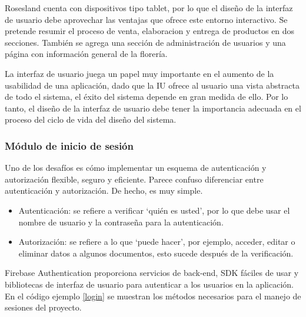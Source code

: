 Rosesland cuenta con dispositivos tipo tablet, por lo que el diseño de la interfaz de usuario debe aprovechar las ventajas que ofrece este entorno interactivo. Se pretende resumir el proceso de venta, elaboracion y entrega de productos en dos secciones. También se agrega una sección de administración de usuarios y una página con información general de la florería.
\vspace{0.8cm}

La interfaz de usuario juega un papel muy importante en el aumento de la usabilidad de una aplicación, dado que la IU ofrece al usuario una vista abstracta de todo el sistema, el éxito del sistema depende en gran medida de ello. Por lo tanto, el diseño de la interfaz de usuario debe tener la importancia adecuada en el proceso del ciclo de vida del diseño del sistema.
\vspace{0.8cm}

\subsubsection{Módulo de inicio de sesión}
Uno de los desafíos es cómo implementar un esquema de autenticación y autorización flexible, seguro y eficiente. Parece confuso diferenciar entre autenticación y autorización. De hecho, es muy simple.

\begin{itemize}
  \item Autenticación: se refiere a verificar `quién es usted', por lo que debe usar el nombre de usuario y la contraseña para la autenticación.

  \item Autorización: se refiere a lo que `puede hacer', por ejemplo, acceder, editar o eliminar datos a algunos documentos, esto sucede después de la verificación.
\end{itemize}

Firebase Authentication proporciona servicios de back-end, SDK fáciles de usar y bibliotecas de interfaz de usuario para autenticar a los usuarios en la aplicación. En el código ejemplo \ref{login} se muestran los métodos necesarios para el manejo de sesiones del proyecto.
\vspace{0.8cm}

